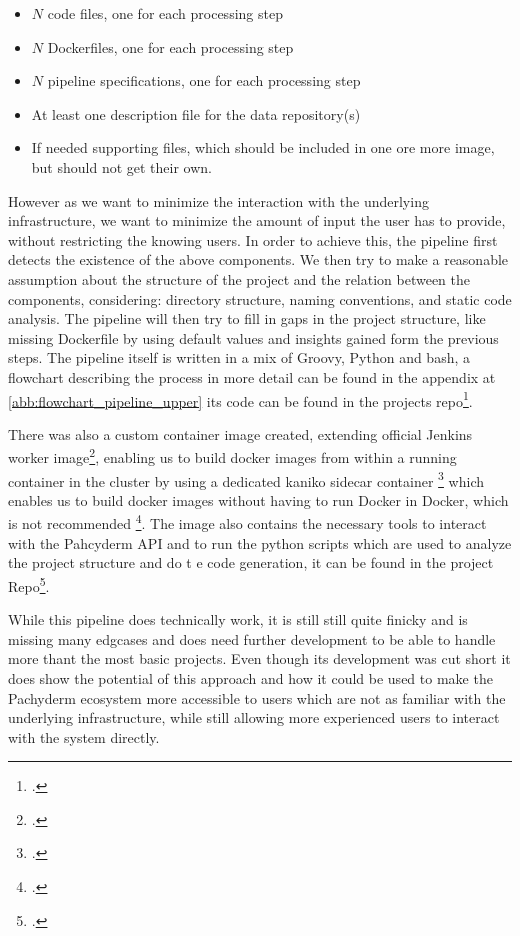 \begin{itemize}
    \item $N$ code files, one for each processing step
    \item $N$ Dockerfiles, one for each processing step
    \item $N$ pipeline specifications, one for each processing step
    \item At least one description file for the data repository(s)
    \item If needed supporting files, which should be included in one ore more image, but should not get their own.
\end{itemize}

However as we want to minimize the interaction with the underlying infrastructure, we want to minimize the amount of input the user has to provide, without restricting the knowing users.
In order to achieve this, the pipeline first detects the existence of the above components.
We then try to make a reasonable assumption about the structure of the project and the relation between the components, considering: directory structure, naming conventions, and static code analysis.
The pipeline will then try to fill in gaps in the project structure, like missing Dockerfile by using default values and insights gained form the previous steps.
The pipeline itself is written in a mix of Groovy, Python and bash, a flowchart describing the process in more detail can be found in the appendix at \ref{abb:flowchart_pipeline_upper} its code can be found in the projects repo\footcite{Pipeline}.

There was also a custom container image created, extending official Jenkins worker image\footcite{JenkinsJenkinsDocker}, enabling us to build docker images from within a running container in the cluster by using a dedicated kaniko 
sidecar container \footcite{KanikoBuildImages2023} which enables us to build docker images without having to run Docker in Docker, which is not recommended \footcite{UsingDockerinDockerYour}.
The image also contains the necessary tools to interact with the Pahcyderm API and to run the python scripts which are used to analyze the project structure and do t   e code generation, it can be found in the project Repo\footcite{PipelineImage}.

While this pipeline does technically work, it is still still quite finicky and is missing many edgcases and does need further development to be able to handle more thant the most basic projects.
Even though its development was cut short it does show the potential of this approach and how it could be used to make the Pachyderm ecosystem more accessible to users which are not as familiar with the underlying infrastructure, 
while still allowing more experienced users to interact with the system directly.